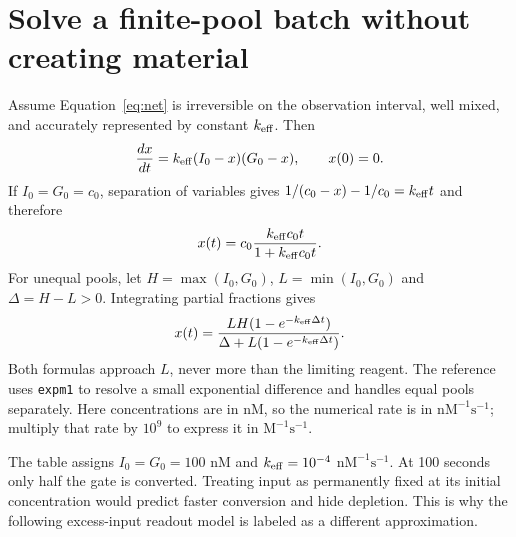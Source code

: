 \section{Solve a finite-pool batch without creating material}
Assume Equation~\ref{eq:net} is irreversible on the observation interval,
well mixed, and accurately represented by constant $k_{\rm eff}$. Then
\begin{equation}
 \frac{dx}{dt}=k_{\rm eff}(I_0-x)(G_0-x),\qquad x(0)=0.
\end{equation}
If $I_0=G_0=c_0$, separation of variables gives
$1/(c_0-x)-1/c_0=k_{\rm eff}t$ and therefore
\begin{equation}
 x(t)=c_0\frac{k_{\rm eff}c_0t}{1+k_{\rm eff}c_0t}.
 \label{eq:batch}
\end{equation}
For unequal pools, let $H=\max(I_0,G_0)$, $L=\min(I_0,G_0)$ and
$\Delta=H-L>0$. Integrating partial fractions gives
\begin{equation}
 x(t)=\frac{LH(1-e^{-k_{\rm eff}\Delta t})}
 {\Delta+L(1-e^{-k_{\rm eff}\Delta t})}.
\end{equation}
Both formulas approach $L$, never more than the limiting reagent. The reference
uses \texttt{expm1} to resolve a small exponential difference and handles equal
pools separately. Here concentrations are in nM, so the numerical rate is in
$\mathrm{nM}^{-1}\mathrm{s}^{-1}$; multiply that rate by $10^9$ to express it
in $\mathrm{M}^{-1}\mathrm{s}^{-1}$.
\begin{center}\end{center}
The table assigns $I_0=G_0=100$ nM and $k_{\rm eff}=10^{-4}$
$\mathrm{nM}^{-1}\mathrm{s}^{-1}$. At 100 seconds only half the gate is
converted. Treating input as permanently fixed at its initial concentration
would predict faster conversion and hide depletion. This is why the following
excess-input readout model is labeled as a different approximation.

